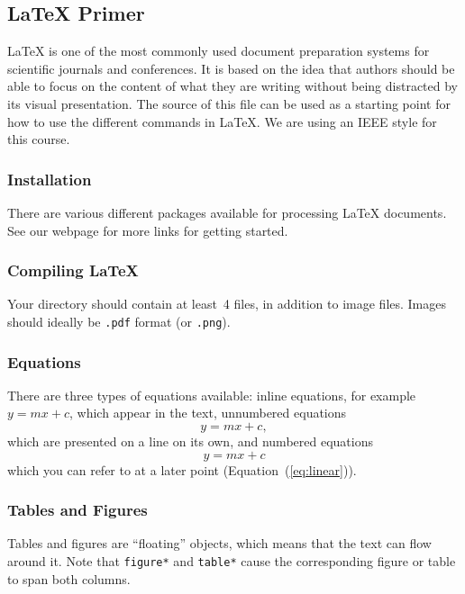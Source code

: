 \documentclass[10pt,conference,compsocconf]{IEEEtran}
\begin{document}
\subsection{\LaTeX{} Primer}
\label{sec:latex-primer}

\LaTeX{} is one of the most commonly used document preparation systems
for scientific journals and conferences. It is based on the idea
that authors should be able to focus on the content of what they are
writing without being distracted by its visual presentation.
The source of this file can be used as a starting point for how to use
the different commands in \LaTeX{}. We are using an IEEE style for
this course.

\subsubsection{Installation}

There are various different packages available for processing \LaTeX{}
documents. See our webpage for more links for getting started.

\subsubsection{Compiling \LaTeX{}}
Your directory should contain at least~4 files, in addition to image
files. Images should ideally be
\texttt{.pdf} format (or \texttt{.png}).

\subsubsection{Equations}

There are three types of equations available: inline equations, for
example $y=mx + c$, which appear in the text, unnumbered equations
$$y=mx + c,$$
which are presented on a line on its own, and numbered equations
\begin{equation}
  \label{eq:linear}
  y = mx + c
\end{equation}
which you can refer to at a later point (Equation~(\ref{eq:linear})).

\subsubsection{Tables and Figures}

Tables and figures are ``floating'' objects, which means that the text
can flow around it.
Note that \texttt{figure*} and \texttt{table*} cause the corresponding
figure or table to span both columns.
\end{document}
